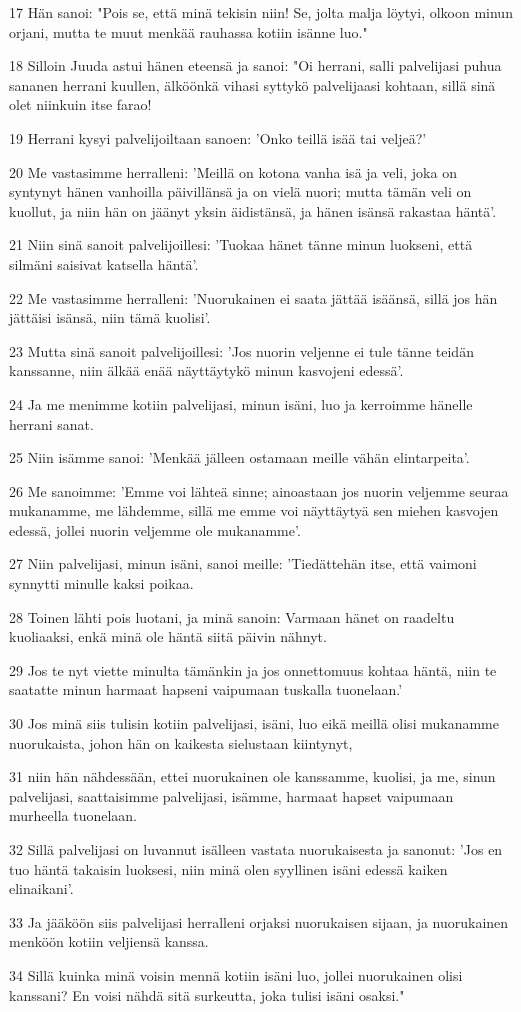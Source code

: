 \par 17 Hän sanoi: "Pois se, että minä tekisin niin! Se, jolta malja löytyi, olkoon minun orjani, mutta te muut menkää rauhassa kotiin isänne luo."
\par 18 Silloin Juuda astui hänen eteensä ja sanoi: "Oi herrani, salli palvelijasi puhua sananen herrani kuullen, älköönkä vihasi syttykö palvelijaasi kohtaan, sillä sinä olet niinkuin itse farao!
\par 19 Herrani kysyi palvelijoiltaan sanoen: 'Onko teillä isää tai veljeä?'
\par 20 Me vastasimme herralleni: 'Meillä on kotona vanha isä ja veli, joka on syntynyt hänen vanhoilla päivillänsä ja on vielä nuori; mutta tämän veli on kuollut, ja niin hän on jäänyt yksin äidistänsä, ja hänen isänsä rakastaa häntä'.
\par 21 Niin sinä sanoit palvelijoillesi: 'Tuokaa hänet tänne minun luokseni, että silmäni saisivat katsella häntä'.
\par 22 Me vastasimme herralleni: 'Nuorukainen ei saata jättää isäänsä, sillä jos hän jättäisi isänsä, niin tämä kuolisi'.
\par 23 Mutta sinä sanoit palvelijoillesi: 'Jos nuorin veljenne ei tule tänne teidän kanssanne, niin älkää enää näyttäytykö minun kasvojeni edessä'.
\par 24 Ja me menimme kotiin palvelijasi, minun isäni, luo ja kerroimme hänelle herrani sanat.
\par 25 Niin isämme sanoi: 'Menkää jälleen ostamaan meille vähän elintarpeita'.
\par 26 Me sanoimme: 'Emme voi lähteä sinne; ainoastaan jos nuorin veljemme seuraa mukanamme, me lähdemme, sillä me emme voi näyttäytyä sen miehen kasvojen edessä, jollei nuorin veljemme ole mukanamme'.
\par 27 Niin palvelijasi, minun isäni, sanoi meille: 'Tiedättehän itse, että vaimoni synnytti minulle kaksi poikaa.
\par 28 Toinen lähti pois luotani, ja minä sanoin: Varmaan hänet on raadeltu kuoliaaksi, enkä minä ole häntä siitä päivin nähnyt.
\par 29 Jos te nyt viette minulta tämänkin ja jos onnettomuus kohtaa häntä, niin te saatatte minun harmaat hapseni vaipumaan tuskalla tuonelaan.'
\par 30 Jos minä siis tulisin kotiin palvelijasi, isäni, luo eikä meillä olisi mukanamme nuorukaista, johon hän on kaikesta sielustaan kiintynyt,
\par 31 niin hän nähdessään, ettei nuorukainen ole kanssamme, kuolisi, ja me, sinun palvelijasi, saattaisimme palvelijasi, isämme, harmaat hapset vaipumaan murheella tuonelaan.
\par 32 Sillä palvelijasi on luvannut isälleen vastata nuorukaisesta ja sanonut: 'Jos en tuo häntä takaisin luoksesi, niin minä olen syyllinen isäni edessä kaiken elinaikani'.
\par 33 Ja jääköön siis palvelijasi herralleni orjaksi nuorukaisen sijaan, ja nuorukainen menköön kotiin veljiensä kanssa.
\par 34 Sillä kuinka minä voisin mennä kotiin isäni luo, jollei nuorukainen olisi kanssani? En voisi nähdä sitä surkeutta, joka tulisi isäni osaksi."

